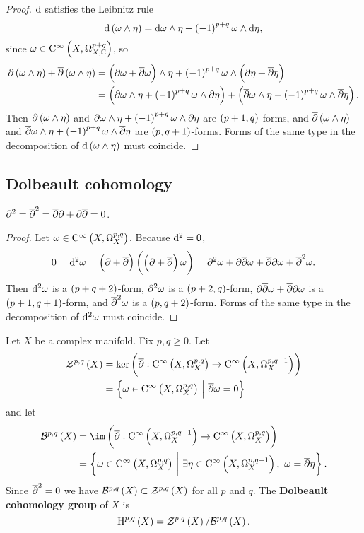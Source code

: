 \begin{proof}
$ \mathrm{d} $ satisfies the Leibnitz rule
$$ \d\br{\omega \wedge \eta} = \d\omega \wedge \eta + \br{-1}^{p + q}\omega \wedge \d\eta, $$
since $ \omega \in \COC{X}{p + q} $, so
\begin{align*}
\da\br{\omega \wedge \eta} + \dab\br{\omega \wedge \eta}
& = \br{\da\omega + \dab\omega} \wedge \eta + \br{-1}^{p + q}\omega \wedge \br{\da\eta + \dab\eta} \\
& = \br{\da\omega \wedge \eta + \br{-1}^{p + q}\omega \wedge \da\eta} + \br{\dab\omega \wedge \eta + \br{-1}^{p + q}\omega \wedge \dab\eta}.
\end{align*}
Then $ \da\br{\omega \wedge \eta} $ and $ \da\omega \wedge \eta + \br{-1}^{p + q}\omega \wedge \da\eta $ are $ \br{p + 1, q} $-forms, and $ \dab\br{\omega \wedge \eta} $ and $ \dab\omega \wedge \eta + \br{-1}^{p + q}\omega \wedge \dab\eta $ are $ \br{p, q + 1} $-forms. Forms of the same type in the decomposition of $ \d\br{\omega \wedge \eta} $ must coincide.
\end{proof}

\subsection{Dolbeault cohomology}

\begin{lemma}
$ \partial^2 = \overline{\partial}^2 = \overline{\partial}\partial + \partial\overline{\partial} = 0 $.
\end{lemma}

\begin{proof}
Let $ \omega \in \CO{X}{p, q} $. Because $ \mathrm{d}^2 = 0 $,
$$ 0 = \d^2\omega = \br{\da + \dab}\br{\br{\da + \dab}\omega} = \da^2\omega + \da\dab\omega + \dab\da\omega + \dab^2\omega. $$
Then $ \mathrm{d}^2\omega $ is a $ \br{p + q + 2} $-form, $ \partial^2\omega $ is a $ \br{p + 2, q} $-form, $ \partial\overline{\partial}\omega + \overline{\partial}\partial\omega $ is a $ \br{p + 1, q + 1} $-form, and $ \overline{\partial}^2\omega $ is a $ \br{p, q + 2} $-form. Forms of the same type in the decomposition of $ \mathrm{d}^2\omega $ must coincide.
\end{proof}

Let $ X $ be a complex manifold. Fix $ p, q \ge 0 $. Let
\begin{align*}
\ZZZ^{p, q}\br{X}
& = \ker \br{\dab : \CO{X}{p, q} \to \CO{X}{p, q + 1}} \\
& = \cbr{\omega \in \CO{X}{p, q} \st \dab\omega = 0}
\end{align*}
and let
\begin{align*}
\BBB^{p, q}\br{X}
& = \im \br{\dab : \CO{X}{p, q - 1} \to \CO{X}{p, q}} \\
& = \cbr{\omega \in \CO{X}{p, q} \st \exists \eta \in \CO{X}{p, q - 1}, \ \omega = \dab\eta}.
\end{align*}
Since $ \overline{\partial}^2 = 0 $ we have $ \BBB^{p, q}\br{X} \subset \ZZZ^{p, q}\br{X} $ for all $ p $ and $ q $. The \textbf{Dolbeault cohomology group} of $ X $ is
$$ \H^{p, q}\br{X} = \ZZZ^{p, q}\br{X} / \BBB^{p, q}\br{X}. $$

